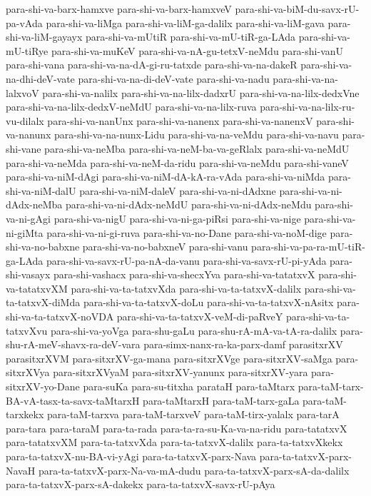 {para-shi-va-barx-hamxve
para-shi-va-barx-hamxveV
para-shi-va-biM-du-savx-rU-pa-vAda
para-shi-va-liMga
para-shi-va-liM-ga-dalilx
para-shi-va-liM-gava
para-shi-va-liM-gayayx
para-shi-va-mUtiR
para-shi-va-mU-tiR-ga-LAda
para-shi-va-mU-tiRye
para-shi-va-muKeV
para-shi-va-nA-gu-tetxV-neMdu
para-shi-vanU
para-shi-vana
para-shi-va-na-dA-gi-ru-tatxde
para-shi-va-na-dakeR
para-shi-va-na-dhi-deV-vate
para-shi-va-na-di-deV-vate
para-shi-va-nadu
para-shi-va-na-lalxvoV
para-shi-va-nalilx
para-shi-va-na-lilx-dadxrU
para-shi-va-na-lilx-dedxVne
para-shi-va-na-lilx-dedxV-neMdU
para-shi-va-na-lilx-ruva
para-shi-va-na-lilx-ru-vu-dilalx
para-shi-va-nanUnx
para-shi-va-nanenx
para-shi-va-nanenxV
para-shi-va-nanunx
para-shi-va-na-nunx-Lidu
para-shi-va-na-veMdu
para-shi-va-navu
para-shi-vane
para-shi-va-neMba
para-shi-va-neM-ba-va-geRlalx
para-shi-va-neMdU
para-shi-va-neMda
para-shi-va-neM-da-ridu
para-shi-va-neMdu
para-shi-vaneV
para-shi-va-niM-dAgi
para-shi-va-niM-dA-kA-ra-vAda
para-shi-va-niMda
para-shi-va-niM-dalU
para-shi-va-niM-daleV
para-shi-va-ni-dAdxne
para-shi-va-ni-dAdx-neMba
para-shi-va-ni-dAdx-neMdU
para-shi-va-ni-dAdx-neMdu
para-shi-va-ni-gAgi
para-shi-va-nigU
para-shi-va-ni-ga-piRsi
para-shi-va-nige
para-shi-va-ni-giMta
para-shi-va-ni-gi-ruva
para-shi-va-no-Dane
para-shi-va-noM-dige
para-shi-va-no-babxne
para-shi-va-no-babxneV
para-shi-vanu
para-shi-va-pa-ra-mU-tiR-ga-LAda
para-shi-va-savx-rU-pa-nA-da-vanu
para-shi-va-savx-rU-pi-yAda
para-shi-vasayx
para-shi-vashacx
para-shi-va-shecxYva
para-shi-va-tatatxvX
para-shi-va-tatatxvXM
para-shi-va-ta-tatxvXda
para-shi-va-ta-tatxvX-dalilx
para-shi-va-ta-tatxvX-diMda
para-shi-va-ta-tatxvX-doLu
para-shi-va-ta-tatxvX-nAsitx
para-shi-va-ta-tatxvX-noVDA
para-shi-va-ta-tatxvX-veM-di-paRveY
para-shi-va-ta-tatxvXvu
para-shi-va-yoVga
para-shu-gaLu
para-shu-rA-mA-va-tA-ra-dalilx
para-shu-rA-meV-shavx-ra-deV-vara
para-simx-nanx-ra-ka-parx-damf
parasitxrXV
parasitxrXVM
para-sitxrXV-ga-mana
para-sitxrXVge
para-sitxrXV-saMga
para-sitxrXVya
para-sitxrXVyaM
para-sitxrXV-yanunx
para-sitxrXV-yara
para-sitxrXV-yo-Dane
para-suKa
para-su-titxha
parataH
para-taMtarx
para-taM-tarx-BA-vA-tasx-ta-savx-taMtarxH
para-taMtarxH
para-taM-tarx-gaLa
para-taM-tarxkekx
para-taM-tarxva
para-taM-tarxveV
para-taM-tirx-yalalx
para-tarA
para-tara
para-taraM
para-ta-rada
para-ta-ra-su-Ka-va-na-ridu
para-tatatxvX
para-tatatxvXM
para-ta-tatxvXda
para-ta-tatxvX-dalilx
para-ta-tatxvXkekx
para-ta-tatxvX-nu-BA-vi-yAgi
para-ta-tatxvX-parx-Nava
para-ta-tatxvX-parx-NavaH
para-ta-tatxvX-parx-Na-va-mA-dudu
para-ta-tatxvX-parx-sA-da-dalilx
para-ta-tatxvX-parx-sA-dakekx
para-ta-tatxvX-savx-rU-pAya
}

